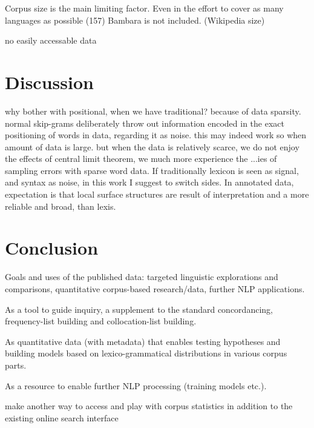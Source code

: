 \documentclass[12pt]{article}
\begin{document}
Corpus size is the main limiting factor. Even in the effort to cover
as many languages as possible (157) Bambara is not
included. (Wikipedia size)


no easily accessable data 

\section{Discussion}

why bother with positional, when we have traditional?  because of data
sparsity. normal skip-grams deliberately throw out information encoded
in the exact positioning of words in data, regarding it as noise. this
may indeed work so when amount of data is large. but when the data is
relatively scarce, we do not enjoy the effects of central limit
theorem, we much more experience the ...ies of sampling errors with
sparse word data. If traditionally lexicon is seen as signal, and
syntax as noise, in this work I suggest to switch sides. In annotated
data, expectation is that local surface structures are result of
interpretation and a more reliable and broad, than lexis. 



\section{Conclusion}

Goals and uses of the published data: targeted linguistic explorations
and comparisons, quantitative corpus-based research/data, further NLP
applications. 

As a tool to guide inquiry, a supplement to the standard
concordancing, frequency-list building and collocation-list building.

As quantitative data (with metadata) that enables testing hypotheses
and building models based on lexico-grammatical distributions in
various corpus parts. 

As a resource to enable further NLP processing (training models
etc.).

make another way to access and play with corpus statistics in addition
to the existing online search interface
\end{document}
